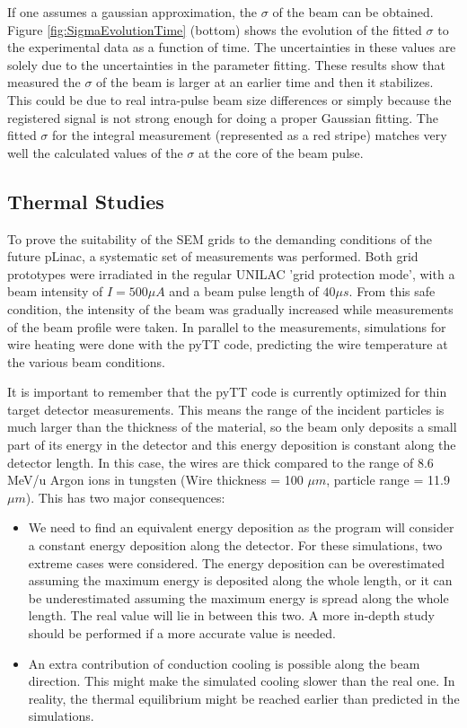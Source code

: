 If one assumes a gaussian approximation, the $\sigma$ of the beam can be obtained. Figure \ref{fig:SigmaEvolutionTime} (bottom) shows the evolution of the fitted $\sigma$ to the experimental data as a function of time. The uncertainties in these values are solely due to the uncertainties in the parameter fitting. These results show that measured the $\sigma$ of the beam is larger at an earlier time and then it stabilizes. This could be due to real intra-pulse beam size differences or simply because the registered signal is not strong enough for doing a proper Gaussian fitting. The fitted $\sigma$ for the integral measurement (represented as a red stripe) matches very well the calculated values of the $\sigma$ at the core of the beam pulse. 

\subsection{Thermal Studies}
\label{sec:GSIThStudies}

To prove the suitability of the SEM grids to the demanding conditions of the future pLinac, a systematic set of measurements was performed. Both grid prototypes were irradiated in the regular UNILAC 'grid protection mode', with a beam intensity of $I = 500 \mu A $ and a beam pulse length of $40 \mu s$. From this safe condition, the intensity of the beam was gradually increased while measurements of the beam profile were taken. In parallel to the measurements, simulations for wire heating were done with the pyTT code, predicting the wire temperature at the various beam conditions. 

It is important to remember that the pyTT code is currently optimized for thin target detector measurements. This means the range of the incident particles is much larger than the thickness of the material, so the beam only deposits a small part of its energy in the detector and this energy deposition is constant along the detector length. In this case, the wires are thick compared to the range of 8.6 MeV/u Argon ions in tungsten (Wire thickness = 100 $\mu m$, particle range = 11.9 $\mu m$). This has two major consequences: 

\begin{itemize}
    \item We need to find an equivalent energy deposition as the program will consider a constant energy deposition along the detector. For these simulations, two extreme cases were considered. The energy deposition can be overestimated assuming the maximum energy is deposited along the whole length, or it can be underestimated assuming the maximum energy is spread along the whole length. The real value will lie in between this two. A more in-depth study should be performed if a more accurate value is needed. 
    \item An extra contribution of conduction cooling is possible along the beam direction. This might make the simulated cooling slower than the real one. In reality, the thermal equilibrium might be reached earlier than predicted in the simulations. 
\end{itemize}

